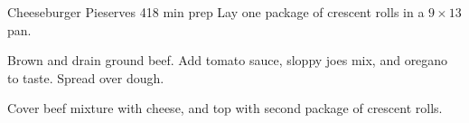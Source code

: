 
\begin{recipe}{Cheeseburger Pie}{serves 4}{18 min prep}
    Lay one package of crescent rolls in a $9 \times 13$ pan.

    Brown and drain ground beef. Add tomato sauce, sloppy joes mix, and oregano to taste. Spread over dough.

    Cover beef mixture with cheese, and top with second package of crescent rolls.

\end{recipe}
